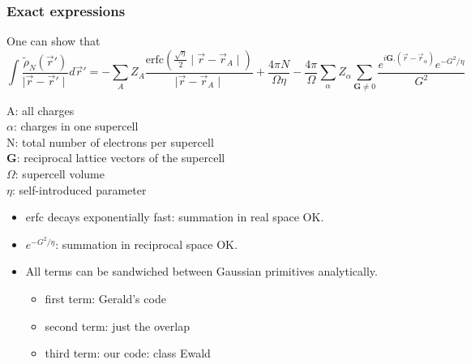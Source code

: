 \documentclass[8pt]{beamer}
\begin{document}
\begin{frame}

   \frametitle{Exact expressions}
   One can show that
   \begin{equation}
   \int \frac{\tilde{\rho}_N(\vec{r}')}{\mid \vec{r} - \vec{r}' \mid} d\vec{r}' = - \sum\limits_A Z_A \frac{\text{erfc}\left( \frac{\sqrt{\eta}}{2} \mid \vec{r} - \vec{r}_A \mid \right)}{\mid \vec{r} - \vec{r}_A \mid} + \frac{4 \pi N}{\Omega \eta} - \frac{4 \pi}{\Omega} \sum\limits_{\alpha} Z_{\alpha} \sum\limits_{\mathbf{G} \neq 0} \frac{e^{i \mathbf{G}.(\vec{r} - \vec{r}_{\alpha})} e^{-G^2/\eta}}{G^2}
   \end{equation}
   
   A: all charges\\
   $\alpha$: charges in one supercell\\
   N: total number of electrons per supercell\\
   $\mathbf{G}$: reciprocal lattice vectors of the supercell\\
   $\Omega$: supercell volume\\
   $\eta$: self-introduced parameter
   
   \begin{itemize}
   \item erfc decays exponentially fast: summation in real space OK.\\
   \item $e^{-G^2/\eta}$: summation in reciprocal space OK.\\
   \item All terms can be sandwiched between Gaussian primitives analytically.
   \begin{itemize}
   \item first term: Gerald's code
   \item second term: just the overlap
   \item third term: our code: class Ewald
   \end{itemize}
   \end{itemize}

\end{frame}
\end{document}
